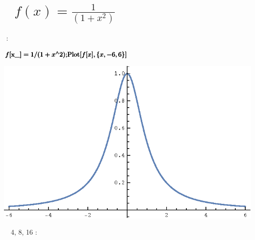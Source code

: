 \documentclass{article}
\newcommand{\unicode}[1]{{}}
\begin{document}
\section*{$\unicode{0418}\unicode{043d}\unicode{0442}\unicode{0435}\unicode{0440}\unicode{043f}\unicode{043e}\unicode{043b}\unicode{044f}\unicode{0446}\unicode{0438}\unicode{044f}$
$\unicode{0444}\unicode{0443}\unicode{043d}\unicode{043a}\unicode{0446}\unicode{0438}\unicode{0438}$ \(f(x)=\frac{1}{\left(1+x^2\right)}\) $\unicode{043d}\unicode{0430}$
$\unicode{0440}\unicode{0430}\unicode{0432}\unicode{043d}\unicode{043e}\unicode{043c}\unicode{0435}\unicode{0440}\unicode{043d}\unicode{043e}\unicode{0439}$
$\unicode{0441}\unicode{0435}\unicode{0442}\unicode{043a}\unicode{0435}$}

$\unicode{0418}\unicode{0437}\unicode{043d}\unicode{0430}\unicode{0447}\unicode{0430}\unicode{043b}\unicode{044c}\unicode{043d}\unicode{0430}\unicode{044f}$
$\unicode{0444}\unicode{0443}\unicode{043d}\unicode{043a}\unicode{0446}\unicode{0438}\unicode{044f}$:

\begin{doublespace}
\noindent\(\pmb{f[\text{x$\_$}] = 1/(1+x{}^{\wedge}2);}\\
\pmb{\text{Plot}[f[x], \{x, -6, 6\}]}\)
\end{doublespace}

\includegraphics{report_gr1.eps}

$\unicode{0420}\unicode{0430}\unicode{0437}\unicode{043e}\unicode{0431}\unicode{044c}\unicode{0435}\unicode{043c}$ $\unicode{043f}\unicode{0440}\unicode{043e}\unicode{043c}\unicode{0435}\unicode{0436}\unicode{0443}\unicode{0442}\unicode{043e}\unicode{043a}$
$\unicode{043d}\unicode{0430}$ 4, 8, 16 $\unicode{0438}\unicode{043d}\unicode{0442}\unicode{0435}\unicode{0440}\unicode{0432}\unicode{0430}\unicode{043b}\unicode{043e}\unicode{0432}$:
\end{document}
